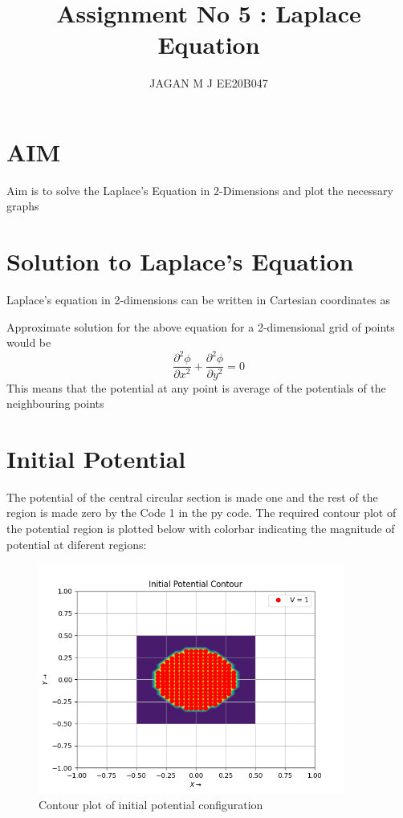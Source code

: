 \documentclass[10pt,a4paper]{article}
\date{}
\begin{document}
\title{Assignment No 5 : Laplace Equation}
\author{JAGAN M J EE20B047}
\maketitle


\section{AIM}

Aim is to solve the Laplace's Equation in $2$-Dimensions and plot the necessary graphs

\section{Solution to Laplace's Equation}
Laplace's equation in 2-dimensions can  be written in Cartesian coordinates as 





Approximate solution for the above equation for a 2-dimensional grid of points would be 
\begin{equation}
 \frac{\partial^{2} \phi}{\partial x^{2}}+ \frac{\partial^{2} \phi}{\partial y^{2}} = 0
 \end{equation}
This means that the potential at any point is average of the potentials of the neighbouring points

\section{Initial Potential}
The potential of the central circular section is made one and the rest of the region is made zero by the Code 1 in the py code. The required contour plot of the potential region is plotted below with colorbar indicating the magnitude of potential at diferent regions:\newline \newline \newline \newline 

\begin{figure}[!tbh]

\includegraphics[width = 0.9\textwidth]{1.png}
\caption{Contour plot of initial potential configuration}

\end{figure}
\end{document}
